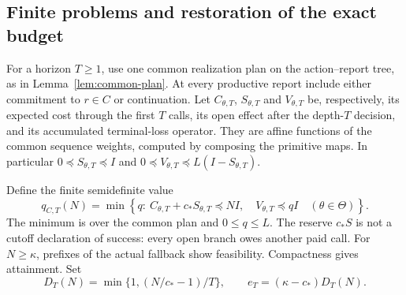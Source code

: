 \subsection{Finite problems and restoration of the exact budget}
For a horizon $T\ge1$, use one common realization plan on the action--report tree, as in Lemma~\ref{lem:common-plan}. At every productive report include either commitment to $r\in C$ or continuation. Let $C_{\theta,T}$, $S_{\theta,T}$ and $V_{\theta,T}$ be, respectively, its expected cost through the first $T$ calls, its open effect after the depth-$T$ decision, and its accumulated terminal-loss operator. They are affine functions of the common sequence weights, computed by composing the primitive maps. In particular $0\preccurlyeq S_{\theta,T}\preccurlyeq I$ and $0\preccurlyeq V_{\theta,T}\preccurlyeq L(I-S_{\theta,T})$.

Define the finite semidefinite value
\begin{equation}\label{eq:primitive-finite}
 q_{C,T}(N)=\min\left\{q:\ C_{\theta,T}+c_*S_{\theta,T}\preccurlyeq NI,
 \quad V_{\theta,T}\preccurlyeq qI\quad(\theta\in\Theta)\right\}.
\end{equation}
The minimum is over the common plan and $0\le q\le L$. The reserve $c_*S$ is not a cutoff declaration of success: every open branch owes another paid call. For $N\ge\kappa$, prefixes of the actual fallback show feasibility. Compactness gives attainment. Set
\[
 D_T(N)=\min\{1,(N/c_*-1)/T\},\qquad
 e_T=(\kappa-c_*)D_T(N).
\]

